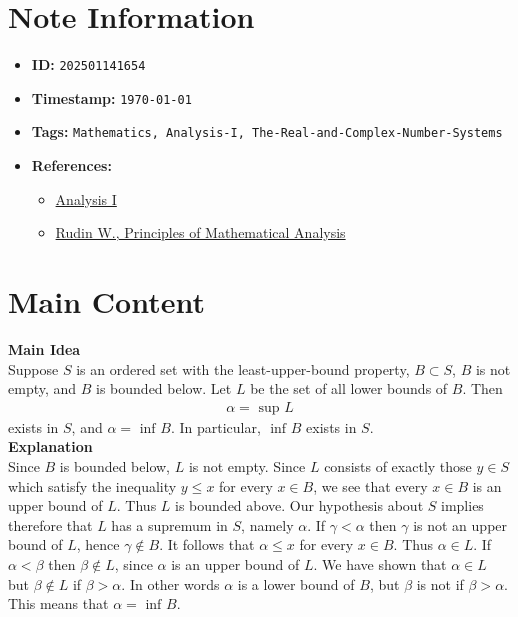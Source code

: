 \clearpage
{}
\label{202501141654}
\renewcommand{\notetitle}{Relation between Sup and Inf}

\section*{Note Information}
\begin{itemize}
  \item \textbf{ID:} \texttt{202501141654}
  \item \textbf{Timestamp:} \texttt{\today \ \currenttime}
  \item \textbf{Tags:} \texttt{Mathematics, Analysis-I, The-Real-and-Complex-Number-Systems}
  \item \textbf{References:}
    \begin{itemize}
      \item \href{https://ocw.mit.edu/courses/18-100b-analysis-i-fall-2010/}{Analysis I}
      \item \href{/home/garrett/Personal/References/Mathematics/Analysis-I/Rudin.pdf}{Rudin W., Principles of Mathematical Analysis}
    \end{itemize}
\end{itemize}


\section*{Main Content}
\textbf{Main Idea}\\
Suppose $S$ is an ordered set with the least-upper-bound property, $B \subset S$, $B$ is not empty, and $B$ is bounded below. Let $L$ be the set of all lower bounds of $B$. Then 
\begin{align*}
  \alpha = \text{ sup } L
\end{align*}
exists in $S$, and $\alpha = \text{ inf } B$. In particular, $\text{ inf } B$ exists in $S$.\\

\textbf{Explanation}\\
Since $B$ is bounded below, $L$ is not empty. Since $L$ consists of exactly those $y \in S$ which satisfy the inequality $y \leq x$ for every $x \in B$, we see that every $x \in B$ is an upper bound of $L$. Thus $L$ is bounded above. Our hypothesis about $S$ implies therefore that $L$ has a supremum in $S$, namely $\alpha$. If $\gamma < \alpha$ then $\gamma$ is not an upper bound of $L$, hence $\gamma \not\in B$. It follows that $\alpha \leq x$ for every $x \in B$. Thus $\alpha \in L$. If $\alpha < \beta$ then $\beta \not \in L$, since $\alpha$ is an upper bound of $L$. We have shown that $\alpha \in L$ but $\beta \not \in L$ if $\beta > \alpha$. In other words $\alpha$ is a lower bound of $B$, but $\beta$ is not if $\beta > \alpha$. This means that $\alpha = \text{ inf } B$.  \\



